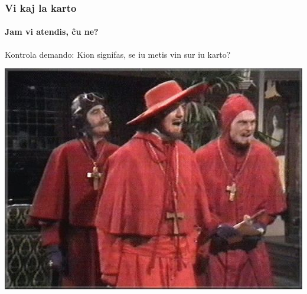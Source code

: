 	    

  \begin{frame}
    \frametitle{Vi kaj la karto}
    \framesubtitle{Jam vi atendis, ĉu ne?}
	
	\begin{center}
		\begin{block}{Kontrola demando:}
			Kion signifas, se iu metis vin sur iu karto?
		\end{block}
	\end{center}
	
	\begin{center}
	    \includegraphics[scale=0.3]{meme/hispana_inkvizicio}
    \end{center}	    
    
  \end{frame}
	    

